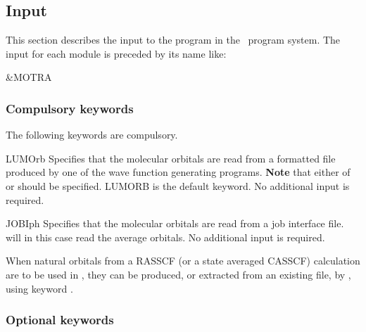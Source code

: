 \subsection{Input}
\label{UG:sec:motra_input}

This section describes the input to the  program in the \molcas\ program system.
The input for each module is preceded by its name like:
\begin{inputlisting}
 &MOTRA
\end{inputlisting}

\subsubsection{Compulsory keywords}
The following keywords are compulsory.
\begin{keywordlist}
\item[LUMOrb]
Specifies that the molecular orbitals are read from a formatted file
produced by one of the wave function generating programs.
{\bf Note} that either of  or  should be
specified. LUMORB is the default keyword.
No additional input is required.
\item[JOBIph]
Specifies that the molecular orbitals are read from a  job
interface file.  will in this case read the average orbitals.
No additional input is required.
\end{keywordlist}

When natural orbitals from a RASSCF (or a state averaged CASSCF)
calculation are to be used in
, they can be produced, or extracted from an existing
 file, by , using keyword .

\subsubsection{Optional keywords}

